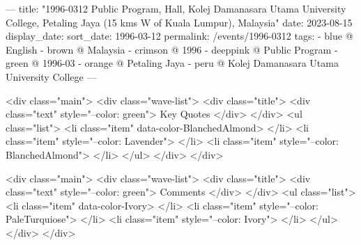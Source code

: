 ---
title: "1996-0312 Public Program, Hall, Kolej Damanasara Utama University College, Petaling Jaya (15 kms W of Kuala Lumpur), Malaysia"
date: 2023-08-15
display_date: 
sort_date: 1996-03-12
permalink: /events/1996-0312
tags:
  - blue @ English
  - brown @ Malaysia
  - crimson @ 1996
  - deeppink @ Public Program
  - green @ 1996-03
  - orange @ Petaling Jaya 
  - peru @ Kolej Damanasara Utama University College
---

<div class="main">
  <div class="wave-list">
    <div class="title">
      <div class="text" style="--color: green">
        Key Quotes
      </div>
    </div>
    <ul class="list">
        <li class="item" data-color-BlanchedAlmond>
        </li>
        <li class="item" style="--color: Lavender">
        </li>
        <li class="item" style="--color: BlanchedAlmond">
        </li>
      </ul>
  </div>
</div>

<div class="main">
  <div class="wave-list">
    <div class="title">
      <div class="text" style="--color: green">
        Comments
      </div>
    </div>
    <ul class="list">
        <li class="item" data-color-Ivory>
        </li>
        <li class="item" style="--color: PaleTurquiose">
        </li>
        <li class="item" style="--color: Ivory">
        </li>
      </ul>
  </div>
</div>